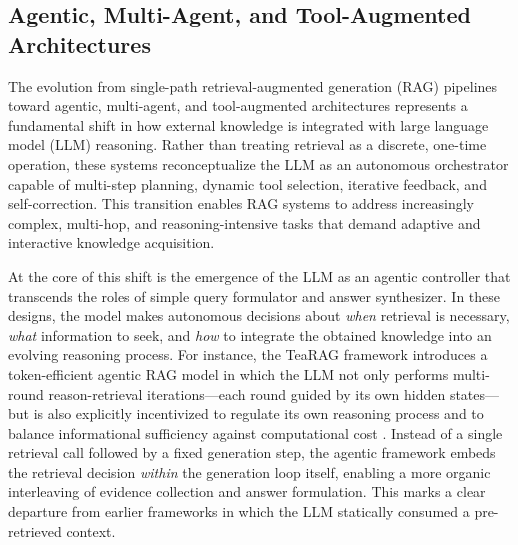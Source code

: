 \documentclass[11pt,a4paper]{article}
\begin{document}
\subsection{Agentic, Multi-Agent, and Tool-Augmented Architectures}


The evolution from single-path retrieval-augmented generation (RAG) pipelines toward agentic, multi-agent, and tool-augmented architectures represents a fundamental shift in how external knowledge is integrated with large language model (LLM) reasoning. Rather than treating retrieval as a discrete, one-time operation, these systems reconceptualize the LLM as an autonomous orchestrator capable of multi-step planning, dynamic tool selection, iterative feedback, and self-correction. This transition enables RAG systems to address increasingly complex, multi-hop, and reasoning-intensive tasks that demand adaptive and interactive knowledge acquisition.

At the core of this shift is the emergence of the LLM as an agentic controller that transcends the roles of simple query formulator and answer synthesizer. In these designs, the model makes autonomous decisions about \emph{when} retrieval is necessary, \emph{what} information to seek, and \emph{how} to integrate the obtained knowledge into an evolving reasoning process. For instance, the TeaRAG framework introduces a token-efficient agentic RAG model in which the LLM not only performs multi-round reason-retrieval iterations---each round guided by its own hidden states---but is also explicitly incentivized to regulate its own reasoning process and to balance informational sufficiency against computational cost \cite{arxiv:2511.05385v2}. Instead of a single retrieval call followed by a fixed generation step, the agentic framework embeds the retrieval decision \emph{within} the generation loop itself, enabling a more organic interleaving of evidence collection and answer formulation. This marks a clear departure from earlier frameworks in which the LLM statically consumed a pre-retrieved context.
\end{document}
